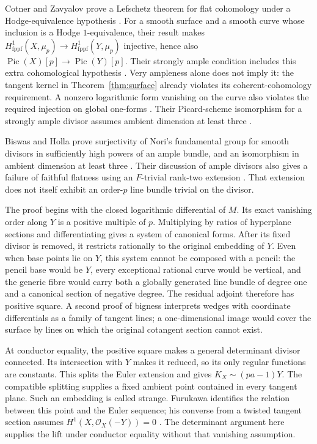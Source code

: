 \documentclass[11pt]{article}
\theoremstyle{remark}\newtheorem{remark}[theorem]{Remark}
\newcommand{\OO}{\mathcal O}
\newcommand{\Pic}{\operatorname{Pic}}
\begin{document}
Cotner and Zavyalov prove a Lefschetz theorem for flat cohomology under a Hodge-equivalence hypothesis \cite[Corollary~3.1.2]{CotnerZavyalov}. For a smooth surface and a smooth curve whose inclusion is a Hodge $1$-equivalence, their result makes $H^1_{\mathrm{fppf}}(X,\mu_p)\to H^1_{\mathrm{fppf}}(Y,\mu_p)$ injective, hence also $\Pic(X)[p]\to\Pic(Y)[p]$. Their strongly ample condition includes this extra cohomological hypothesis \cite[Definition~2.3.5]{CotnerZavyalov}. Very ampleness alone does not imply it: the tangent kernel in Theorem~\ref{thm:surface} already violates its coherent-cohomology requirement. A nonzero logarithmic form vanishing on the curve also violates the required injection on global one-forms \cite[Definition~2.2.1]{CotnerZavyalov}. Their Picard-scheme isomorphism for a strongly ample divisor assumes ambient dimension at least three \cite[Theorem~3.4.4]{CotnerZavyalov}.

Biswas and Holla prove surjectivity of Nori's fundamental group for smooth divisors in sufficiently high powers of an ample bundle, and an isomorphism in ambient dimension at least three \cite[Theorem~1.1, author p.~2]{BiswasHolla}. Their discussion of ample divisors also gives a failure of faithful flatness using an $F$-trivial rank-two extension \cite[Section~2, especially Remark~2.4, author pp.~3--7]{BiswasHolla}. That extension does not itself exhibit an order-$p$ line bundle trivial on the divisor.

The proof begins with the closed logarithmic differential of $M$.
Its exact vanishing order along $Y$ is a positive multiple of $p$.
Multiplying by ratios of hyperplane sections and differentiating gives
a system of canonical forms. After its fixed divisor is removed, it
restricts rationally to the original embedding of $Y$.
Even when base points lie on $Y$, this system cannot be composed with
a pencil: the pencil base would be $Y$, every exceptional rational
curve would be vertical, and the generic fibre would carry both a
globally generated line bundle of degree one and a canonical section
of negative degree. The residual adjoint therefore has positive
square. A second proof of bigness interprets wedges with coordinate
differentials as a family of tangent lines; a one-dimensional image
would cover the surface by lines on which the original cotangent
section cannot exist.

At conductor equality, the positive square makes a general
determinant divisor connected. Its intersection with $Y$ makes it
reduced, so its only regular functions are constants. This splits
the Euler extension and gives $K_X\sim(pa-1)Y$.
The compatible splitting supplies a fixed ambient point contained
in every tangent plane. Such an embedding is called strange.
Furukawa identifies the relation between this point and the Euler
sequence; his converse from a twisted tangent section assumes
$H^1(X,\OO_X(-Y))=0$
\cite[Propositions~2.5 and~2.10, author pp.~4--6]{FurukawaStrange}.
The determinant argument here supplies the lift under conductor
equality without that vanishing assumption.
\end{document}
